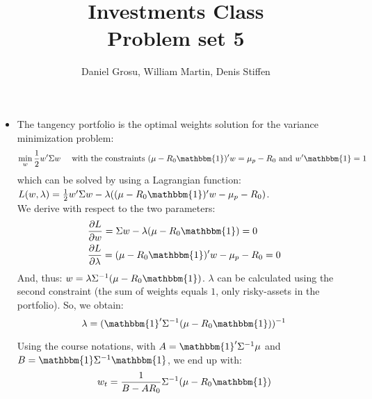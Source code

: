 \documentclass[10pt]{article}
\newenvironment{exercise}[2][Exercise]{\begin{trivlist}
  \item[\hskip \labelsep {\bfseries #1}\hskip \labelsep {\bfseries #2.}]}{\end{trivlist}}
\begin{document}
	
  \renewcommand{\qedsymbol}{\smiley}
	\title{Investments Class \\ Problem set 5}
	\author{Daniel Grosu, William Martin, Denis Stiffen}
		
\maketitle

\begin{exercise}{1}
  \begin{itemize}
    \item The tangency portfolio is the optimal weights solution for the variance minimization problem:
    $$ \min_w{\frac{1}{2}w'\Sigma w} \quad \text{ with the constraints } (\mu-R_0\mathbbm{1})'w = \mu_p-R_0 \text{ and } w'\mathbbm{1} = 1$$ which can be solved by using a Lagrangian function: $L(w,\lambda) =  \frac{1}{2}w'\Sigma w - \lambda((\mu-R_0\mathbbm{1})'w - \mu_p-R_0)$. 
    \\
    We derive with respect to the two parameters:
    \begin{align*}
      &\frac{\partial L}{\partial w} = \Sigma w -\lambda (\mu-R_0\mathbbm{1}) = 0 \\
      &\frac{\partial L}{\partial \lambda} = (\mu-R_0\mathbbm{1})'w - \mu_p-R_0 = 0 
    \end{align*}
    And, thus: $w = \lambda\Sigma^{-1}(\mu-R_0\mathbbm{1})$. $\lambda$ can be calculated using the second constraint (the sum of weights equals $1$, only risky-assets in the portfolio). So, we obtain:
    $$ \lambda = (\mathbbm{1}'\Sigma^{-1}(\mu-R_0\mathbbm{1}))^{-1}$$
    
    Using the course notations, with $A = \mathbbm{1}'\Sigma^{-1}\mu$ and $B=\mathbbm{1}\Sigma^{-1}\mathbbm{1}$, we end up with:
    $$ w_t = \frac{1}{B-AR_0}\Sigma^{-1}(\mu-R_0\mathbbm{1})$$
    

\end{itemize}
\end{exercise}
\end{document}
